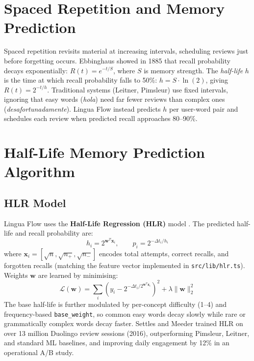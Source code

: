 \documentclass[10pt,a4paper]{article}
\begin{document}
\section{Spaced Repetition and Memory Prediction}
Spaced repetition revisits material at increasing intervals, scheduling reviews just before forgetting occurs. Ebbinghaus \cite{ebbinghaus1885gedachtnis} showed in 1885 that recall probability decays exponentially: $R(t) = e^{-t/S}$, where $S$ is memory strength. The \emph{half-life} $h$ is the time at which recall probability falls to 50\%: $h = S \cdot \ln(2)$, giving $R(t) = 2^{-t/h}$. Traditional systems (Leitner, Pimsleur) use fixed intervals, ignoring that easy words (\textit{hola}) need far fewer reviews than complex ones (\textit{desafortunadamente}). Lingua Flow instead predicts $h$ per user-word pair and schedules each review when predicted recall approaches 80--90\%.

\section{Half-Life Memory Prediction Algorithm}

\subsection{HLR Model}
Lingua Flow uses the \textbf{Half-Life Regression (HLR)} model \cite{settles2016trainable}. The predicted half-life and recall probability are:
\begin{equation}
    h_i = 2^{\mathbf{w}^T \mathbf{x}_i}, \qquad p_i = 2^{-\Delta t_i / h_i}
\end{equation}
where $\mathbf{x}_i = [\sqrt{n}, \sqrt{n_+}, \sqrt{n_-}]$ encodes total attempts, correct recalls, and forgotten recalls (matching the feature vector implemented in \texttt{src/lib/hlr.ts}). Weights $\mathbf{w}$ are learned by minimising:
\begin{equation}
    \mathcal{L}(\mathbf{w}) = \sum_{i}\!\left(y_i - 2^{-\Delta t_i / 2^{\mathbf{w}^T\mathbf{x}_i}}\right)^{\!2} + \lambda\|\mathbf{w}\|_2^2
\end{equation}
The base half-life is further modulated by per-concept difficulty (1--4) and frequency-based \texttt{base\_weight}, so common easy words decay slowly while rare or grammatically complex words decay faster. Settles and Meeder trained HLR on over 13 million Duolingo review sessions (2016), outperforming Pimsleur, Leitner, and standard ML baselines, and improving daily engagement by 12\% in an operational A/B study.
\end{document}
